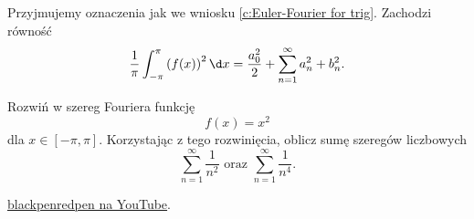 \begin{corollary}
    Przyjmujemy oznaczenia jak we wniosku \ref{c:Euler-Fourier for trig}. Zachodzi równość
    \[ \frac{1}{\pi}\int_{-\pi}^\pi \left(f(x)\right)^2 \d x = \frac{a_0^2}{2} + \sum_{n=1}^\infty a_n^2 + b_n^2. \]
\end{corollary}

\begin{example}
    Rozwiń w szereg Fouriera funkcję
    \[ f(x) = x^2 \]
    dla $x \in [-\pi, \pi]$. Korzystając z tego rozwinięcia, oblicz sumę szeregów liczbowych
    \[ \sum_{n=1}^\infty \frac{1}{n^2} \text{ oraz } \sum_{n=1}^\infty \frac{1}{n^4}. \]
\end{example}
\begin{solution}
    \href{https://www.youtube.com/watch?v=2VYBGF_MPIU}{blackpenredpen na YouTube}.
\end{solution}